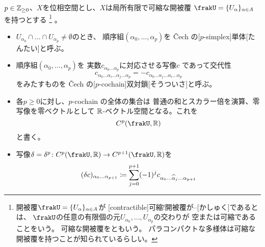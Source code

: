 \documentclass[report]{jlreq}
\begin{document}
\begin{definition}
    $p \in \mathbb{Z}_{\ge 0}$、$X$を位相空間とし、$X$は局所有限で可縮な開被覆
    $\frakU = \{U_\alpha\}_{\alpha \in A}$を持つとする
    \footnote{
        開被覆$\frakU = \{ U_\alpha \}_{\alpha \in A}$が
        [contractible]{可縮!開被覆が--}[かしゅく]であるとは、
        $\frakU$の任意の有限個の元$U_{\alpha_0}, \dots, U_{\alpha_p}$の交わりが
        空または可縮であることをいう。
        可縮な開被覆をともいう。
        パラコンパクトな多様体は可縮な開被覆を持つことが知られているらしい。
    }
    。
    \begin{itemize}
        \item $U_{\alpha_0} \cap \dots \cap U_{\alpha_p} \neq \emptyset$のとき、
            順序組$(\alpha_0, \dots, \alpha_p)$を
            \v{C}ech の[$p$-simplex]{単体}[たんたい]と呼ぶ。
        \item 順序組$(\alpha_0, \dots, \alpha_p)$を
            実数$c_{\alpha_0 \dots \alpha_p}$に対応させる写像$c$
            であって交代性
            \begin{equation}
                c_{\alpha_0 \dots \alpha_i \dots \alpha_j \dots \alpha_p}
                    = - c_{\alpha_0 \dots \alpha_j \dots \alpha_i \dots \alpha_p}
            \end{equation}
            をみたすものを
            \v{C}ech の[$p$-cochain]{双対鎖}[そうついさ]と呼ぶ。
        \item 各$p \ge 0$に対し、$p$-cochain の全体の集合は
            普通の和とスカラー倍を演算、零写像を零ベクトルとして
            $\mathbb{R}$-ベクトル空間となる。これを
            \begin{equation}
                C^p(\frakU, \R)
            \end{equation}
            と書く。
        \item 写像$\delta = \delta^{p}
            \colon C^p(\frakU, \R) \to C^{p+1}(\frakU, \R)$を
            \begin{equation}
                (\delta c)_{\alpha_0 \dots \alpha_{p + 1}}
                    \coloneqq \sum_{j = 0}^{p + 1}
                    (-1)^j c_{\alpha_0 \dots \widehat{\alpha}_j \dots \alpha_{p + 1}}
            \end{equation}

\end{itemize}
\end{definition}
\end{document}
